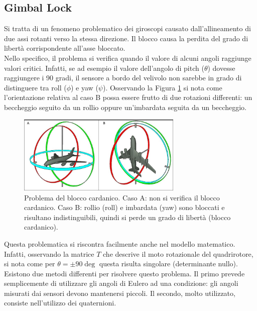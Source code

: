 \subsection{Gimbal Lock}
Si tratta di un fenomeno problematico dei giroscopi causato dall'allineamento di due assi rotanti verso la stessa direzione. Il blocco causa la perdita del grado di libertà corrispondente all'asse bloccato.\\

Nello specifico, il problema si verifica quando il valore di alcuni angoli raggiunge valori critici. Infatti, se ad esempio il valore dell'angolo di pitch ($\theta$) dovesse raggiungere i 90 gradi, il sensore a bordo del velivolo non sarebbe in grado di distinguere tra roll ($\phi$) e yaw ($\psi$). Osservando la Figura \ref{fig:gimbal_lock} si nota come l'orientazione relativa al caso B possa essere frutto di due rotazioni differenti: un beccheggio seguito da un rollio oppure un'imbardata seguita da un beccheggio.

\begin{figure}[H]
    \centering
    \includegraphics[width=0.7\textwidth]{gfx/gimbal_lock}
    \caption[Problema del blocco cardanico.]{Problema del blocco cardanico. Caso A: non si verifica il blocco cardanico. Caso B: rollio (roll) e imbardata (yaw) sono bloccati e risultano indistinguibili, quindi si perde un grado di libertà (blocco cardanico).}
    \label{fig:gimbal_lock}
\end{figure}

Questa problematica si riscontra facilmente anche nel modello matematico. Infatti, osservando la matrice $T$ che descrive il moto rotazionale del quadrirotore, si nota come per $\theta = \pm 90 \deg$ questa risulta singolare (determinante nullo).\\

Esistono due metodi differenti per risolvere questo problema. Il primo prevede semplicemente di utilizzare gli angoli di Eulero ad una condizione: gli angoli misurati dai sensori devono mantenersi piccoli. Il secondo, molto utilizzato, consiste nell'utilizzo dei quaternioni.

